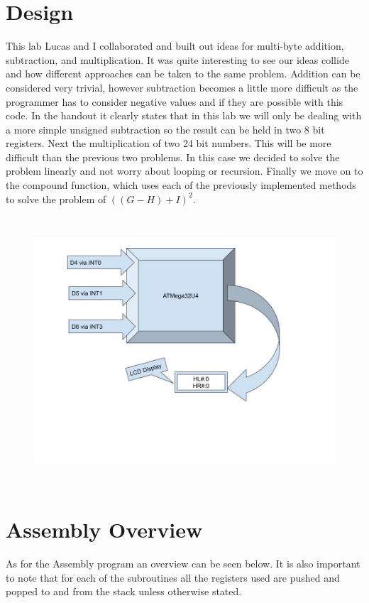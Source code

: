 \documentclass[12pt,letterpaper]{article}
\begin{document}
\section{Design}
This lab Lucas and I collaborated and built out ideas for multi-byte addition, subtraction, and multiplication. It was quite interesting to see our ideas collide and how different approaches can be taken to the same problem. Addition can be considered very trivial, however subtraction becomes a little more difficult as the programmer has to consider negative values and if they are possible with this code. In the handout it clearly states that in this lab we will only be dealing with a more simple unsigned subtraction so the result can be held in two 8 bit registers. Next the multiplication of two 24 bit numbers. This will be more difficult than the previous two problems. In this case we decided to solve the problem linearly and not worry about looping or recursion. Finally we move on to the compound function, which uses each of the previously implemented methods to solve the problem of \(((G-H)+I)^2\). 

\begin{figure}[h]
	\includegraphics[width=12cm, height=10cm]{Block Diagram L5.jpg}
	\centering
\end{figure}
	
\section{Assembly Overview}
As for the Assembly program an overview can be seen below. It is also important to note that for each of the subroutines all the registers used are pushed and popped to and from the stack unless otherwise stated.
\end{document}
